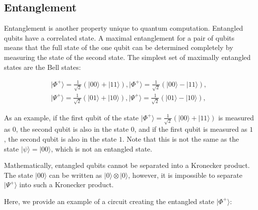 \documentclass{article}
\begin{document}
\subsection{Entanglement}

Entanglement is another property unique to quantum computation. Entangled qubits have a correlated state. A maximal entanglement for a pair of qubits means that the full state of the one qubit can be determined completely by measuring the state of the second state. The simplest set of maximally entangled states are the Bell states:


 \begin{multline}
\lvert \Phi ^+ \rangle = \frac{1}{\sqrt{2}} ( \lvert 00 \rangle + \lvert 11 \rangle ), \lvert \Phi ^+ \rangle = \frac{1}{\sqrt{2}} ( \lvert 00 \rangle - \lvert 11 \rangle ), \\ \lvert \Psi ^+ \rangle = \frac{1}{\sqrt{2}} ( \lvert 01 \rangle + \lvert 10 \rangle ), \lvert \Psi ^+ \rangle = \frac{1}{\sqrt{2}} ( \lvert 01 \rangle - \lvert 10 \rangle ),
\end{multline}

As an example, if the first qubit of the state $ \lvert \Phi ^+ \rangle = \frac{1}{\sqrt{2}} ( \lvert 00 \rangle + \lvert 11 \rangle ) $ is measured as $0$, the second qubit is also in the state $0$, and if the first qubit is measured as $1$, the second qubit is also in the state $1$. Note that this is not the same as the state $ \lvert \psi \rangle = \lvert 00 \rangle $, which is not an entangled state.

Mathematically, entangled qubits cannot be separated into a Kronecker product. The state $ \lvert 00 \rangle $ can be written as $ \lvert 0 \rangle \otimes \lvert 0 \rangle $, however, it is impossible to separate $ \lvert \Psi^+ \rangle $ into such a Kronecker product.


Here, we provide an example of a circuit creating the entangled state $ \lvert \Phi^+ \rangle $:



\end{document}

